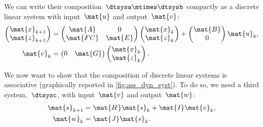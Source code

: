 We can write their composition~$\dtsysa\mtimes \dtsysb$ compactly as a discrete linear system with input~$\mat{u}$ and output~$\mat{v}$:
\begin{equation*}
    \label{eq:dlin-3}
    \begin{aligned}
        \begin{pmatrix}
            \mat{x}_{k+1} \\
            \mat{z}_{k+1}
        \end{pmatrix}&=
        \begin{pmatrix}
            \mat{A}  & 0       \\
            \mat{FC} & \mat{E}
        \end{pmatrix}\begin{pmatrix}
                         \mat{x}_k\\ \mat{z}_k
        \end{pmatrix}+
        \begin{pmatrix}
            \mat{B}\\ 0
        \end{pmatrix}\mat{u}_k,\\
        \mat{v}_k&=\begin{pmatrix}
                       0& \mat{G}
        \end{pmatrix} \begin{pmatrix}
                          \mat{x}_k \\ \mat{z}_k
        \end{pmatrix}.
    \end{aligned}
\end{equation*}

We now want to show that the composition of discrete linear systems is associative (graphically reported in \cref{fig:ass_dyn_syst}).
To do so, we need a third system,~$\dtsysc$, with input~$\mat{v}$ and output~$\mat{w}$:
\begin{equation*}
    \label{eq:dlin-4}
    \begin{aligned}
        \mat{s}_{k+1} &= \mat{H} \mat{s}_k + \mat{I} \mat{v}_k, \\
        \mat{w}_{k}   &= \mat{J} \mat{s}_k.
    \end{aligned}
\end{equation*}

